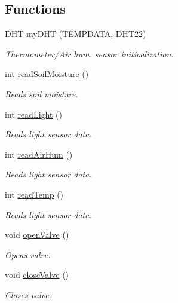 \subsection*{Functions}
\begin{DoxyCompactItemize}
\item 
D\+HT \hyperlink{group__vars_gad6792c9d57a95299da095bfc059e14b3}{my\+D\+HT} (\hyperlink{group__const_gad85c50d1f6e8fb6bba261da3691fcb3f}{T\+E\+M\+P\+D\+A\+TA}, D\+H\+T22)
\begin{DoxyCompactList}\small\item\em Thermometer/\+Air hum. sensor initioalization. \end{DoxyCompactList}\item 
int \hyperlink{group__fn_gad9f70a6b7041c4076dedeee90f6d8310}{read\+Soil\+Moisture} ()
\begin{DoxyCompactList}\small\item\em Reads soil moisture. \end{DoxyCompactList}\item 
int \hyperlink{group__fn_gaf1d63455e5a91999225f25fd0cebc18e}{read\+Light} ()
\begin{DoxyCompactList}\small\item\em Reads light sensor data. \end{DoxyCompactList}\item 
int \hyperlink{group__fn_ga3f52b419973bff123775a1563e885dd5}{read\+Air\+Hum} ()
\begin{DoxyCompactList}\small\item\em Reads light sensor data. \end{DoxyCompactList}\item 
int \hyperlink{group__fn_ga74a34c8130ac7351dc0b1e449064e012}{read\+Temp} ()
\begin{DoxyCompactList}\small\item\em Reads light sensor data. \end{DoxyCompactList}\item 
void \hyperlink{group__fn_gaaa5719f3ed552267c274e0d67ba68eb0}{open\+Valve} ()
\begin{DoxyCompactList}\small\item\em Opens valve. \end{DoxyCompactList}\item 
void \hyperlink{group__fn_ga997df9668870770cd913acabd010f672}{close\+Valve} ()
\begin{DoxyCompactList}\small\item\em Closes valve. \end{DoxyCompactList}\item 

\end{DoxyCompactItemize}
